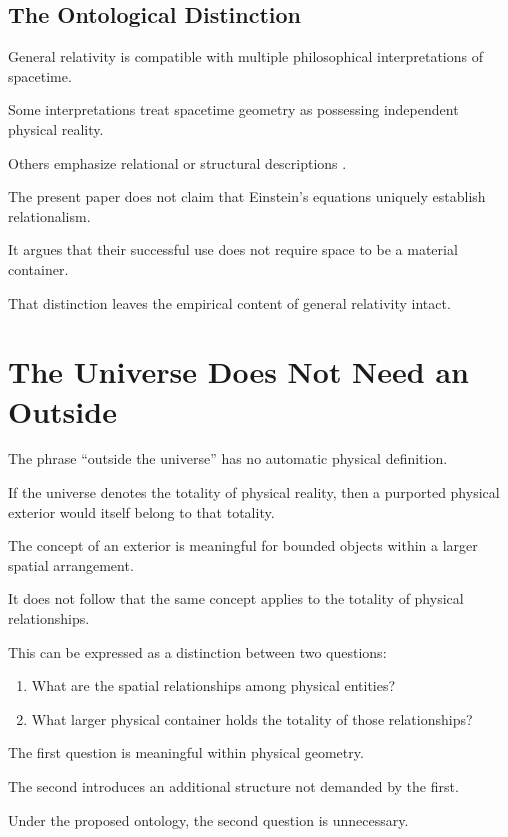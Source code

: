 \documentclass[12pt,onecolumn]{article}
\begin{document}
\subsection{The Ontological Distinction}

General relativity is compatible with
multiple philosophical interpretations
of spacetime.

Some interpretations treat spacetime
geometry as possessing independent
physical reality.

Others emphasize relational or
structural descriptions
\citep{rovelli2004,earman1989}.

The present paper does not claim that
Einstein's equations uniquely establish
relationalism.

It argues that their successful use
does not require space to be a
material container.

That distinction leaves the empirical
content of general relativity intact.

\section{The Universe Does Not Need an Outside}

The phrase ``outside the universe''
has no automatic physical definition.

If the universe denotes the totality
of physical reality, then a purported
physical exterior would itself belong
to that totality.

The concept of an exterior is meaningful
for bounded objects within a larger
spatial arrangement.

It does not follow that the same concept
applies to the totality of physical
relationships.

This can be expressed as a distinction
between two questions:

\begin{enumerate}
\item What are the spatial relationships
among physical entities?
\item What larger physical container
holds the totality of those relationships?
\end{enumerate}

The first question is meaningful
within physical geometry.

The second introduces an additional
structure not demanded by the first.

Under the proposed ontology,
the second question is unnecessary.
\end{document}

